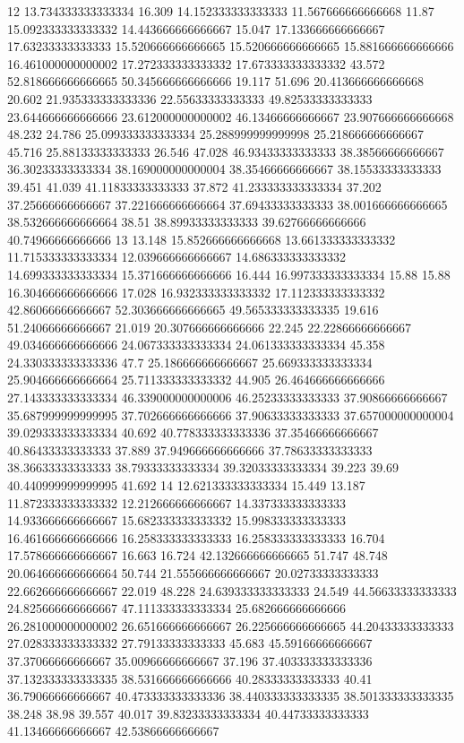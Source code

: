 12 13.734333333333334 16.309 14.152333333333333 11.567666666666668 11.87 15.092333333333332 14.443666666666667 15.047 17.133666666666667 17.63233333333333 15.520666666666665 15.520666666666665 15.881666666666666 16.461000000000002 17.272333333333332 17.673333333333332 43.572 52.818666666666665 50.345666666666666 19.117 51.696 20.413666666666668 20.602 21.935333333333336 22.55633333333333 49.82533333333333 23.644666666666666 23.612000000000002 46.13466666666667 23.907666666666668 48.232 24.786 25.099333333333334 25.288999999999998 25.218666666666667 45.716 25.88133333333333 26.546 47.028 46.93433333333333 38.38566666666667 36.30233333333334 38.169000000000004 38.35466666666667 38.15533333333333 39.451 41.039 41.11833333333333 37.872 41.233333333333334 37.202 37.25666666666667 37.221666666666664 37.69433333333333 38.001666666666665 38.532666666666664 38.51 38.89933333333333 39.62766666666666 40.74966666666666
13 13.148 15.852666666666668 13.661333333333332 11.715333333333334 12.039666666666667 14.686333333333332 14.699333333333334 15.371666666666666 16.444 16.997333333333334 15.88 15.88 16.304666666666666 17.028 16.932333333333332 17.112333333333332 42.86066666666667 52.303666666666665 49.565333333333335 19.616 51.24066666666667 21.019 20.307666666666666 22.245 22.22866666666667 49.034666666666666 24.067333333333334 24.061333333333334 45.358 24.330333333333336 47.7 25.186666666666667 25.669333333333334 25.904666666666664 25.711333333333332 44.905 26.464666666666666 27.143333333333334 46.339000000000006 46.25233333333333 37.90866666666667 35.687999999999995 37.702666666666666 37.90633333333333 37.657000000000004 39.029333333333334 40.692 40.778333333333336 37.35466666666667 40.86433333333333 37.889 37.949666666666666 37.78633333333333 38.36633333333333 38.79333333333334 39.32033333333334 39.223 39.69 40.440999999999995 41.692
14 12.621333333333334 15.449 13.187 11.872333333333332 12.212666666666667 14.337333333333333 14.933666666666667 15.682333333333332 15.998333333333333 16.461666666666666 16.258333333333333 16.258333333333333 16.704 17.578666666666667 16.663 16.724 42.132666666666665 51.747 48.748 20.064666666666664 50.744 21.555666666666667 20.02733333333333 22.662666666666667 22.019 48.228 24.639333333333333 24.549 44.56633333333333 24.825666666666667 47.111333333333334 25.682666666666666 26.281000000000002 26.651666666666667 26.225666666666665 44.20433333333333 27.028333333333332 27.79133333333333 45.683 45.59166666666667 37.37066666666667 35.00966666666667 37.196 37.403333333333336 37.132333333333335 38.531666666666666 40.28333333333333 40.41 36.79066666666667 40.473333333333336 38.440333333333335 38.501333333333335 38.248 38.98 39.557 40.017 39.83233333333334 40.44733333333333 41.13466666666667 42.53866666666667
